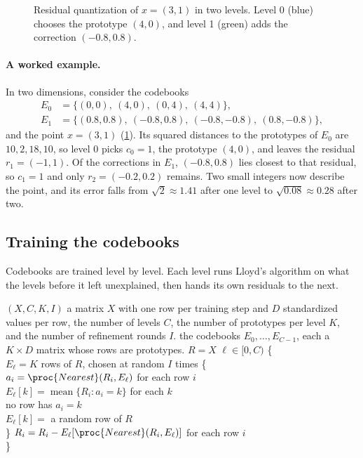 \begin{figure}[htbp]
\centering

\caption{Residual quantization of $x = (3,1)$ in two levels. Level 0 (blue)
chooses the prototype $(4,0)$, and level 1 (green) adds the correction
$(-0.8, 0.8)$.}
\label{fig:rvq}
\end{figure}

\paragraph{A worked example.} In two dimensions, consider the codebooks
\begin{align*}
E_0 &= \{(0,0),\ (4,0),\ (0,4),\ (4,4)\},\\
E_1 &= \{(0.8,0.8),\ (-0.8,0.8),\ (-0.8,-0.8),\ (0.8,-0.8)\},
\end{align*}
and the point $x = (3,1)$ (\cref{fig:rvq}). Its squared distances to the
prototypes of $E_0$ are $10, 2, 18, 10$, so level 0 picks $c_0 = 1$, the
prototype $(4, 0)$, and leaves the residual $r_1 = (-1, 1)$. Of the corrections
in $E_1$, $(-0.8, 0.8)$ lies closest to that residual, so $c_1 = 1$ and only
$r_2 = (-0.2, 0.2)$ remains. Two small integers now describe the point, and
its error falls from $\sqrt 2 \approx 1.41$ after one level to
$\sqrt{0.08} \approx 0.28$ after two.

\subsection{Training the codebooks}

Codebooks are trained level by level. Each level runs Lloyd's algorithm on
what the levels before it left unexplained, then hands its own residuals to
the next.

\begin{procedure}{$(X, C, K, I)$}
{a matrix $X$ with one row per training step and $D$ standardized values per
row, the number of levels $C$, the number of prototypes per level $K$, and the
number of refinement rounds $I$.}
{the codebooks $E_0, \dots, E_{C-1}$, each a $K \times D$ matrix whose rows are
prototypes.}
\li $R = X$  \groupend
\li {} $\ell \in [0, C)$ \{ \\
\li \> $E_\ell = K$ rows of $R$, chosen at random \groupend
\li \>  $I$ times \{ \\
\li \> \> $a_i = \proc{Nearest}(R_i, E_\ell)$ for each row $i$ \\
\li \> \> $E_\ell[k] = \operatorname{mean}\{R_i : a_i = k\}$ for each $k$ \\
\li \> \>  no row has $a_i = k$ \\
\li \> \> \> $E_\ell[k] = $ a random row of $R$ \\
\li \> \} \groupend
\li \> $R_i = R_i - E_\ell[\proc{Nearest}(R_i, E_\ell)]$ for each row $i$ \\
\li \}
\end{procedure}

